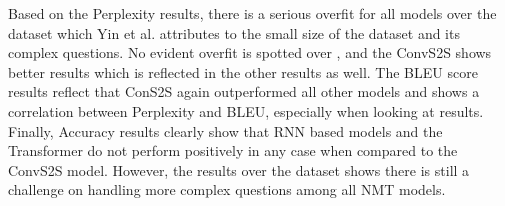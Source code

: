 Based on the Perplexity results, there is a serious overfit for all models over the \LCQuADone{} 
dataset which Yin et al. attributes to the small size of the dataset and its complex questions. 
No evident overfit is spotted over \DBNQA, and the ConvS2S shows better results which is 
reflected in the other results as well. The BLEU score results reflect that ConS2S again 
outperformed all other models and shows a correlation between Perplexity and BLEU, especially 
when looking at \DBNQA{} results. Finally, Accuracy results clearly show that RNN based models and 
the Transformer do not perform positively in any case when compared to the ConvS2S model. 
However, the results over the \LCQuADone{} dataset shows there is still a challenge on handling more 
complex questions among all NMT models.

